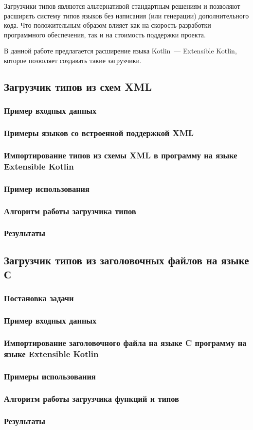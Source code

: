 Загрузчики типов являются альтернативой стандартным решениям и позволяют расширять систему типов языков без написания (или генерации) дополнительного кода.
Что положительным образом влияет как на скорость разработки программного обеспечения, так и на стоимость поддержки проекта.

В данной работе предлагается расширение языка Kotlin~--- Extensible Kotlin, которое позволяет создавать такие загрузчики.



\subsection{Загрузчик типов из схем XML}
\subsubsection{Пример входных данных}
\subsubsection{Примеры языков со встроенной поддержкой XML}
\subsubsection{Импортирование типов из схемы XML в программу на языке Extensible Kotlin}
\subsubsection{Пример использования}
\subsubsection{Алгоритм работы загрузчика типов}
\subsubsection{Результаты}
\subsection{Загрузчик типов из заголовочных файлов на языке С}
\subsubsection{Постановка задачи}
\subsubsection{Пример входных данных}
\subsubsection{Импортирование заголовочного файла на языке C программу на языке Extensible Kotlin}
\subsubsection{Примеры использования}
\subsubsection{Алгоритм работы загрузчика функций и типов}
\subsubsection{Результаты}